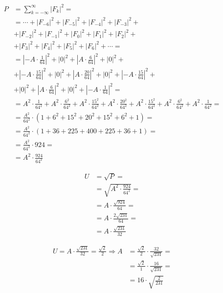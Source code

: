 \begin{task}
\begin{align*}
P &= \sum_{k=-\infty}^{\infty} \left| F_k \right|^2 = \\
  &= \cdots + \left|F_{-6} \right|^2 + \left| F_{-5} \right|^2 + \left| F_{-4} \right|^2 + \left| F_{-3} \right|^2 +\\
  &+ \left| F_{-2} \right|^2 + \left| F_{-1} \right|^2 + \left| F_0 \right|^2 + \left| F_{1} \right|^2 + \left| F_{2} \right|^2 +\\
  &+ \left| F_{3} \right|^2 + \left| F_{4} \right|^2 + \left| F_{5} \right|^2 + \left| F_{6} \right|^2 + \cdots = \\
  &= \left|-A\cdot \frac{1}{64} \right|^2 + \left| 0 \right|^2 + \left| A\cdot \frac{6}{64} \right|^2 + \left| 0 \right|^2 + \\
  &+ \left|-A\cdot \frac{15}{64} \right|^2 + \left| 0 \right|^2 + \left| A\cdot \frac{20}{64} \right|^2 + \left| 0 \right|^2 + \left| -A\cdot \frac{15}{64} \right|^2 +\\ 
  &+ \left| 0 \right|^2 + \left| A\cdot \frac{6}{64} \right|^2 + \left| 0 \right|^2 + \left| -A\cdot \frac{1}{64} \right|^2 = \\
  &= A^2 \cdot \frac{1}{64^2} + A^2 \cdot \frac{6^2}{64^2} + A^2 \cdot \frac{15^2}{64^2} + A^2 \cdot \frac{20^2}{64^2} + A^2 \cdot \frac{15^2}{64^2} + A^2 \cdot \frac{6^2}{64^2} + A^2 \cdot \frac{1}{64^2} = \\
  &= \frac{A^2}{64^2} \cdot \left( 1 + 6^2 + 15^2 + 20^2 + 15^2 + 6^2 + 1\right) =\\
  &= \frac{A^2}{64^2} \cdot \left( 1 + 36 + 225 + 400 + 225 + 36 + 1\right) =\\
  &= \frac{A^2}{64^2} \cdot 924 =\\
  &= A^2 \cdot \frac{924}{64^2}
\end{align*}


\begin{align*}
U &= \sqrt{P} =\\
  &= \sqrt{A^2 \cdot \frac{924}{64^2}} =\\
  &= A \cdot \frac{\sqrt{924}}{64} = \\
  &= A \cdot \frac{2 \sqrt{231}}{64} = \\
  &= A \cdot \frac{\sqrt{231}}{32}
\end{align*}


\begin{align*}
U = A \cdot \frac{\sqrt{231}}{32} = \frac{\sqrt{2}}{2} \Rightarrow A &= \frac{\sqrt{2}}{2} \cdot \frac{32}{\sqrt{231}} = \\
 &= \frac{\sqrt{2}}{1} \cdot \frac{16}{\sqrt{231}} = \\
 &= 16 \cdot \sqrt{\frac{2}{231}} \\
\end{align*}


\end{task}
